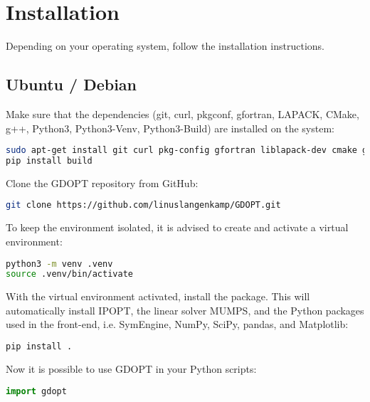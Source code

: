 \documentclass[12pt]{article}
\begin{document}
\section{Installation}

Depending on your operating system, follow the installation instructions.

\subsection{Ubuntu / Debian}

\begin{mdframed}[backgroundcolor=gray!10, roundcorner=10pt,
		linewidth=1pt]

	Make sure that the dependencies (git, curl, pkgconf, gfortran, LAPACK, CMake, g++,
	Python3, Python3-Venv, Python3-Build) are installed on the system:

\begin{lstlisting}[language=bash]
sudo apt-get install git curl pkg-config gfortran liblapack-dev cmake g++ python3 python3-venv
pip install build
\end{lstlisting}

Clone the GDOPT repository from GitHub:

\begin{lstlisting}[language=bash]
git clone https://github.com/linuslangenkamp/GDOPT.git
\end{lstlisting}

	To keep the environment isolated, it is advised to create and activate a
	virtual environment:

	\begin{lstlisting}[language=bash]
python3 -m venv .venv
source .venv/bin/activate
\end{lstlisting}

	With the virtual environment activated, install the package. This will
	automatically install
	IPOPT\cite{wachter2006implementation}, the linear solver
	MUMPS\cite{amestoy2001fully}, and the Python packages used in the front-end,
	i.e. SymEngine\cite{symengine}, NumPy\cite{harris2020array},
	SciPy\cite{virtanen2020scipy}, pandas\cite{mckinney2010data}, and
	Matplotlib\cite{hunter2007matplotlib}:

\begin{lstlisting}[language=bash]
pip install .
\end{lstlisting}

Now it is possible to use GDOPT in your Python scripts:
\begin{lstlisting}[language=python]
import gdopt
\end{lstlisting}


\end{mdframed}
\end{document}
